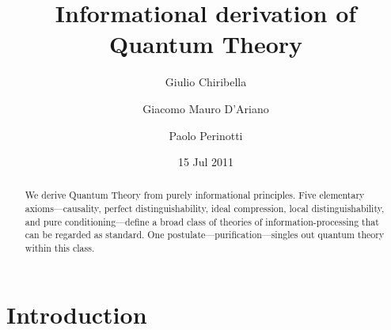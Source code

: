 \documentclass[12pt,aps,pra,showpacs,groupedaddress]{revtex4-1}
\begin{document}
\title{Informational derivation of Quantum Theory}

\author{Giulio Chiribella} 
\author{Giacomo Mauro D'Ariano}
\author{Paolo Perinotti} 
\date{15 Jul 2011}

\begin{abstract} We derive Quantum Theory from purely informational principles.  Five elementary
  axioms---causality, perfect distinguishability, ideal compression, local distinguishability, and
  pure conditioning---define a broad class of theories of information-processing that can be
  regarded as standard. One postulate---purification---singles out quantum theory within this class.
\end{abstract}
\maketitle


\tableofcontents
\section{Introduction}
\end{document}
